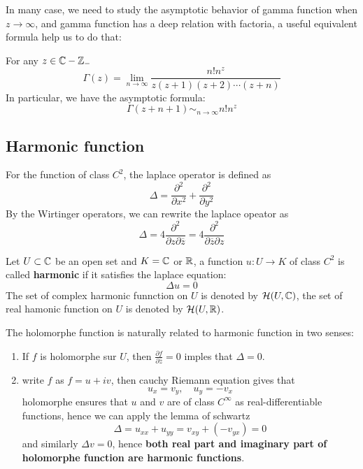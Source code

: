 In many case, we need to study the asymptotic behavior of gamma function when \(z \rightarrow \infty\), and gamma function has a deep relation with factoria, a useful equivalent formula help us to do that:
\begin{proposition}
    For any \(z \in \mathbb{C} - \mathbb{Z}_{-}\)
    \[\Gamma(z) = \lim_{n \to \infty} \frac{n! n^z}{z(z+1)(z+2)\cdots(z+n)}\]
    In particular, we have the asymptotic formula:
    \[\Gamma(z+n+1) \sim_{n \rightarrow \infty} n!n^z\]
\end{proposition}

\subsection{Harmonic function}

For the function of class \(C^2\), the laplace operator is defined as
\[\Delta = \frac{\partial^2}{\partial x^2} + \frac{\partial^2}{\partial y^2}\]
By the Wirtinger operators, we can rewrite the laplace opeator as
\[\Delta = 4\frac{\partial^2}{\partial z \partial \overline{z}} = 4\frac{\partial^2}{\partial \overline{z} \partial z}\]

\begin{definition}
    Let \(U \subset \mathbb{C}\) be an open set and \(K= \mathbb{C}\) or \(\mathbb{R}\), a function \(u: U \to K\) of class \(C^2\) is called \textbf{harmonic} if it satisfies the laplace equation:
    \[\Delta u = 0\]
    The set of complex harmonic funnction on \(U\) is denoted by \(\mathcal{H}(U,\mathbb{C})\), the set of real hamonic function on \(U\) is denoted by \(\mathcal{H}(U,\mathbb{R})\).
\end{definition}

The holomorphe function is naturally related to harmonic function in two senses:
\begin{enumerate}
    \item If \(f \) is holomorphe sur \(U\), then \(\frac{\partial f}{ \partial \bar{z}} = 0\) imples that \(\Delta = 0\).
    \item write \(f\) as \(f = u + iv\), then cauchy Riemann equation gives that
    \[u_x = v_y, \quad u_y = -v_x\]
    holomorphe ensures that \(u\) and \(v\) are of class \(C^{\infty}\) as real-differentiable functions, hence we can apply the lemma of schwartz
    \[\Delta = u_{xx}+u_{yy} = v_{xy} + (-v_{yx}) = 0\]
    and similarly \(\Delta v = 0\), hence \textbf{both real part and imaginary part of holomorphe function are harmonic functions}.
\end{enumerate}

